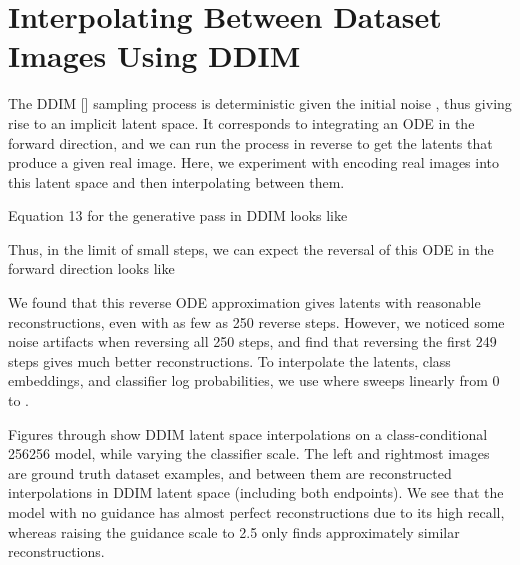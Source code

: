 \documentclass{article}
\newcommand{\shortcite}[1]{[\citenum{#1}]}
\begin{document}
\clearpage
\section{Interpolating Between Dataset Images Using DDIM}

The DDIM \shortcite{ddim} sampling process is deterministic given the initial noise , thus giving rise to an implicit latent space. It corresponds to integrating an ODE in the forward direction, and we can run the process in reverse to get the latents that produce a given real image. Here, we experiment with encoding real images into this latent space and then interpolating between them.

Equation 13 for the generative pass in DDIM looks like


Thus, in the limit of small steps, we can expect the reversal of this ODE in the forward direction looks like


We found that this reverse ODE approximation gives latents with reasonable reconstructions, even with as few as 250 reverse steps. However, we noticed some noise artifacts when reversing all 250 steps, and find that reversing the first 249 steps gives much better reconstructions. To interpolate the latents, class embeddings, and classifier log probabilities, we use  where  sweeps linearly from 0 to .

Figures  through  show DDIM latent space interpolations on a class-conditional 256256 model, while varying the classifier scale. The left and rightmost images are ground truth dataset examples, and between them are reconstructed interpolations in DDIM latent space (including both endpoints). We see that the model with no guidance has almost perfect reconstructions due to its high recall, whereas raising the guidance scale to 2.5 only finds approximately similar reconstructions.
\end{document}

